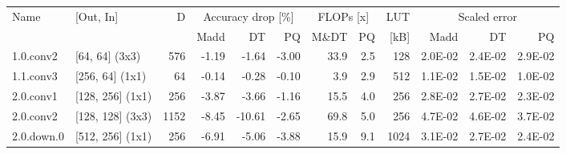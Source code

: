 \begin{table}
\centering
\begin{tabular}{llrrrrrrrrrr}
\toprule
Name & [Out, In] & D & \multicolumn{3}{|c|}{Accuracy drop [\%]} & \multicolumn{2}{|c|}{FLOPs [x]} & LUT & \multicolumn{3}{|c|}{Scaled error} \\
 &  &  & Madd & DT & PQ & M\&DT & PQ & [kB] & Madd & DT & PQ \\
\midrule
1.0.conv2 & [64, 64] (3x3) & 576 & {\cellcolor[HTML]{F5FBB2}} \color[HTML]{000000} -1.19 & {\cellcolor[HTML]{FAFDB8}} \color[HTML]{000000} -1.64 & {\cellcolor[HTML]{FFF8B4}} \color[HTML]{000000} -3.00 & 33.9 & 2.5 & 128 & {\cellcolor[HTML]{F2FAAE}} \color[HTML]{000000} 2.0E-02 & {\cellcolor[HTML]{FFFEBE}} \color[HTML]{000000} 2.4E-02 & {\cellcolor[HTML]{FEEB9D}} \color[HTML]{000000} 2.9E-02 \\
1.1.conv3 & [256, 64] (1x1) & 64 & {\cellcolor[HTML]{EBF7A3}} \color[HTML]{000000} -0.14 & {\cellcolor[HTML]{ECF7A6}} \color[HTML]{000000} -0.28 & {\cellcolor[HTML]{E9F6A1}} \color[HTML]{000000} -0.10 & 3.9 & 2.9 & 512 & {\cellcolor[HTML]{C7E77F}} \color[HTML]{000000} 1.1E-02 & {\cellcolor[HTML]{DCF08F}} \color[HTML]{000000} 1.5E-02 & {\cellcolor[HTML]{C1E57B}} \color[HTML]{000000} 1.0E-02 \\
2.0.conv1 & [128, 256] (1x1) & 256 & {\cellcolor[HTML]{FFF1A8}} \color[HTML]{000000} -3.87 & {\cellcolor[HTML]{FFF2AA}} \color[HTML]{000000} -3.66 & {\cellcolor[HTML]{F5FBB2}} \color[HTML]{000000} -1.16 & 15.5 & 4.0 & 256 & {\cellcolor[HTML]{FFF1A8}} \color[HTML]{000000} 2.8E-02 & {\cellcolor[HTML]{FFF2AA}} \color[HTML]{000000} 2.7E-02 & {\cellcolor[HTML]{FDFEBC}} \color[HTML]{000000} 2.3E-02 \\
2.0.conv2 & [128, 128] (3x3) & 1152 & {\cellcolor[HTML]{FDBD6D}} \color[HTML]{000000} -8.45 & {\cellcolor[HTML]{FA9B58}} \color[HTML]{000000} -10.61 & {\cellcolor[HTML]{FFFBB8}} \color[HTML]{000000} -2.65 & 69.8 & 5.0 & 256 & {\cellcolor[HTML]{F7844E}} \color[HTML]{F1F1F1} 4.7E-02 & {\cellcolor[HTML]{F88C51}} \color[HTML]{F1F1F1} 4.6E-02 & {\cellcolor[HTML]{FDC776}} \color[HTML]{000000} 3.7E-02 \\
2.0.down.0 & [512, 256] (1x1) & 256 & {\cellcolor[HTML]{FED27F}} \color[HTML]{000000} -6.91 & {\cellcolor[HTML]{FEE797}} \color[HTML]{000000} -5.06 & {\cellcolor[HTML]{FFF1A8}} \color[HTML]{000000} -3.88 & 15.9 & 9.1 & 1024 & {\cellcolor[HTML]{FEE593}} \color[HTML]{000000} 3.1E-02 & {\cellcolor[HTML]{FFF2AA}} \color[HTML]{000000} 2.7E-02 & {\cellcolor[HTML]{FFFDBC}} \color[HTML]{000000} 2.4E-02 \\

\end{tabular}
\end{table}
